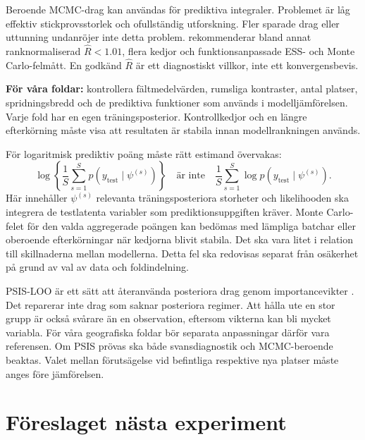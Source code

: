 \documentclass[11pt,a4paper]{article}
\begin{document}
Beroende MCMC-drag kan användas för prediktiva integraler. Problemet är låg effektiv stickprovsstorlek och ofullständig utforskning. Fler sparade drag eller uttunning undanröjer inte detta problem. \citet{vehtari2021rhat} rekommenderar bland annat ranknormaliserad $\widehat R<1.01$, flera kedjor och funktionsanpassade ESS- och Monte Carlo-felmått. En godkänd $\widehat R$ är ett diagnostiskt villkor, inte ett konvergensbevis.

\textbf{För våra foldar:} kontrollera fältmedelvärden, rumsliga kontraster, antal platser, spridningsbredd och de prediktiva funktioner som används i modelljämförelsen. Varje fold har en egen träningsposterior. Kontrollkedjor och en längre efterkörning måste visa att resultaten är stabila innan modellrankningen används.

För logaritmisk prediktiv poäng måste rätt estimand övervakas:
\[
 \log\left\{\frac1S\sum_{s=1}^{S}p(y_{\mathrm{test}}\mid\psi^{(s)})\right\}
 \quad\text{är inte}\quad
 \frac1S\sum_{s=1}^{S}\log p(y_{\mathrm{test}}\mid\psi^{(s)}).
\]
Här innehåller $\psi^{(s)}$ relevanta träningsposteriora storheter och likelihooden ska integrera de testlatenta variabler som prediktionsuppgiften kräver. Monte Carlo-felet för den valda aggregerade poängen kan bedömas med lämpliga batchar eller oberoende efterkörningar när kedjorna blivit stabila. Det ska vara litet i relation till skillnaderna mellan modellerna. Detta fel ska redovisas separat från osäkerhet på grund av val av data och foldindelning.

PSIS-LOO är ett sätt att återanvända posteriora drag genom importancevikter \citep{vehtari2017loo,vehtari2024psis}. Det reparerar inte drag som saknar posteriora regimer. Att hålla ute en stor grupp är också svårare än en observation, eftersom vikterna kan bli mycket variabla. För våra geografiska foldar bör separata anpassningar därför vara referensen. Om PSIS prövas ska både svansdiagnostik och MCMC-beroende beaktas. Valet mellan förutsägelse vid befintliga respektive nya platser måste anges före jämförelsen.

\section{Föreslaget nästa experiment}
\end{document}
